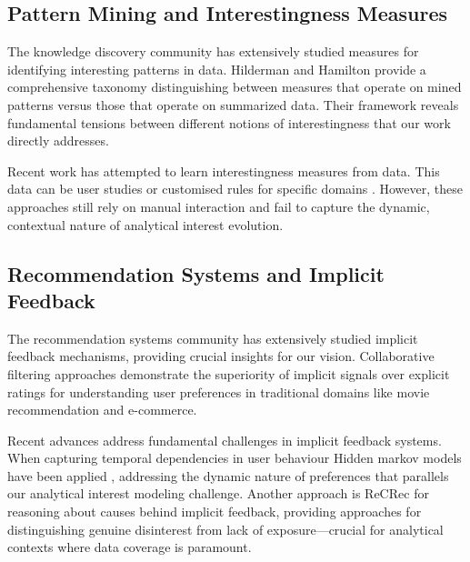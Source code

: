 \documentclass[sigconf, nonacm]{acmart}
\begin{document}
\subsection{Pattern Mining and Interestingness Measures}

The knowledge discovery community has extensively studied measures for identifying interesting patterns in data. Hilderman and Hamilton \cite{robertj.hildermanKnowledgeDiscoveryMeasures2001} provide a comprehensive taxonomy distinguishing between measures that operate on mined patterns versus those that operate on summarized data. Their framework reveals fundamental tensions between different notions of interestingness that our work directly addresses.


Recent work has attempted to learn interestingness measures from data. This data can be user studies \cite{das2018learning} or customised rules for specific domains \cite{ruiz2014learning}. However, these approaches still rely on manual interaction and fail to capture the dynamic, contextual nature of analytical interest evolution.

\subsection{Recommendation Systems and Implicit Feedback}

The recommendation systems community has extensively studied implicit feedback mechanisms, providing crucial insights for our vision. Collaborative filtering approaches \cite{hu2008collaborative, koren2009matrix} demonstrate the superiority of implicit signals over explicit ratings for understanding user preferences in traditional domains like movie recommendation and e-commerce.

Recent advances address fundamental challenges in implicit feedback systems. When capturing temporal dependencies in user behaviour Hidden markov models have been applied \cite{wang2018modeling},  addressing the dynamic nature of preferences that parallels our analytical interest modeling challenge. Another approach is ReCRec \cite{lin2024recrec} for reasoning about causes behind implicit feedback, providing approaches for distinguishing genuine disinterest from lack of exposure—crucial for analytical contexts where data coverage is paramount.
\end{document}
